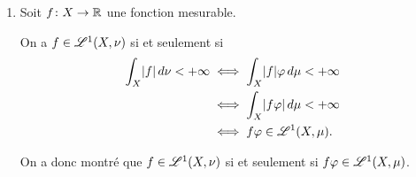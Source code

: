 {\begin{nntd-sol}[]
\begin{enumerate}
\begin{enumerate}
\begin{itemize}
                    \item Si \(f\) est une fonction mesurable positive, 
                    alors il existe une suite croissante de fonctions étagées positives
                    \({\left(f_n\right)}_{n\in\N}\) qui converge simplement vers \(f\). On a alors
                    \begin{equation*}
                        \begin{aligned}
                            \int_X f\der\nu
                            =& \int_X \lim_{n\to+\infty}f_n\der\nu \\
                            \overset{TCM}{=}& \lim_{n\to+\infty}\int_X f_n\der\nu \\
                            \overset{(a)}{=}& \lim_{n\to+\infty}\int_X f_n\varphi\der\mu \\
                            \overset{TCM}{=}& \int_X \lim_{n\to+\infty}f_n\varphi\der\mu \\
                            =& \int_X f\varphi\der\mu.
                        \end{aligned}
                    \end{equation*}
                \end{itemize}

                On a donc montré que pour toute fonction mesurable positive \(f\colon X\to\ff{0,+\infty}\),
                \begin{equation*}
                    \int_X f\der\nu=\int_X f\varphi\der\mu.
                \end{equation*}

                \item Soit \(f\colon X\to\mathbb{R}\) une fonction mesurable.

                On a \(f\in\mathscr{L}^1(X,\nu)\) si et seulement si
                \begin{equation*}
                    \begin{aligned}
                        \int_X \mathopen{}\left|f\right|\mathclose{}\mathop{}\!{d}\nu < +\infty
                        &\iff \int_X \mathopen{}\left|f\right|\mathclose{}\varphi\mathop{}\!{d}\mu < +\infty \\
                        &\iff \int_X \mathopen{}\left|f\varphi\right|\mathclose{}\mathop{}\!{d}\mu < +\infty \\
                        &\iff f\varphi\in\mathscr{L}^1(X,\mu).
                    \end{aligned}
                \end{equation*}

                On a donc montré que \(f\in\mathscr{L}^1(X,\nu)\) si et seulement si \(f\varphi\in\mathscr{L}^1(X,\mu)\).


\end{enumerate}
\end{enumerate}
\end{nntd-sol}}
